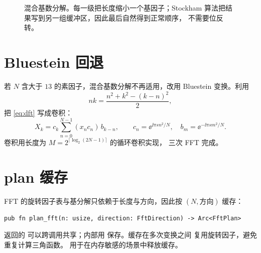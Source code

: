 \begin{figure}[htbp]
    \centering
    \caption[混合基数分解]{混合基数分解。每一级把长度缩小一个基因子；Stockham
             算法把结果写到另一组缓冲区，因此最后自然得到正常顺序，
             不需要位反转。}
    \label{fig:mixed-radix}
\end{figure}

\section{Bluestein 回退}
\label{sec:bluestein}

若 $N$ 含大于 $13$ 的素因子，混合基数分解不再适用，改用 Bluestein
变换。利用
\begin{equation}
    nk = \frac{n^2+k^2-(k-n)^2}{2},
\end{equation}
把 \cref{eq:dft} 写成卷积：
\begin{equation}
    X_k = c_k \sum^{N-1}_{n=0} (x_n c_n)\,b_{k-n},
    \qquad
    c_n = \ee^{\ii\pi s n^2/N},\quad
    b_m = \ee^{-\ii\pi s m^2/N}.
    \label{eq:bluestein}
\end{equation}
卷积用长度为 $M=2^{\lceil\log_2(2N-1)\rceil}$ 的循环卷积实现，
三次 FFT 完成。

\section{plan 缓存}
\label{sec:plan-cache}

FFT 的旋转因子表与基分解只依赖于长度与方向，因此按
$(N,\text{方向})$ 缓存：
\begin{lstlisting}[numbers=none]
pub fn plan_fft(n: usize, direction: FftDirection) -> Arc<FftPlan>
\end{lstlisting}
返回的  可以跨调用共享；内部用
 保存。缓存在多次变换之间
复用旋转因子，避免重复计算三角函数。
用于在内存敏感的场景中释放缓存。

